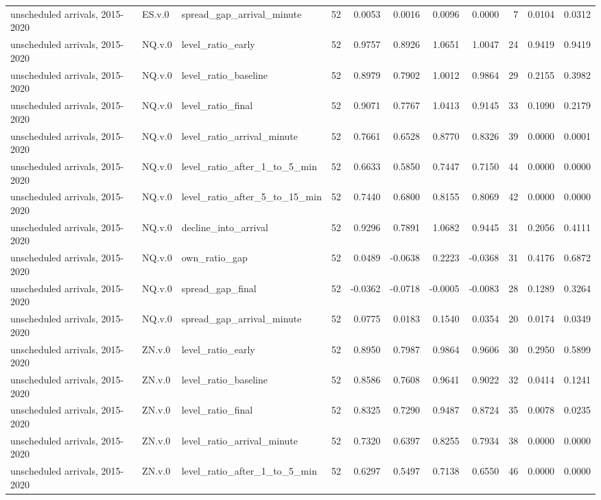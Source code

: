 \begin{tabular}{lllrrrrrrrr}
unscheduled arrivals, 2015-2020 & ES.v.0 & spread_gap_arrival_minute & 52 & 0.0053 & 0.0016 & 0.0096 & 0.0000 & 7 & 0.0104 & 0.0312 \\
unscheduled arrivals, 2015-2020 & NQ.v.0 & level_ratio_early & 52 & 0.9757 & 0.8926 & 1.0651 & 1.0047 & 24 & 0.9419 & 0.9419 \\
unscheduled arrivals, 2015-2020 & NQ.v.0 & level_ratio_baseline & 52 & 0.8979 & 0.7902 & 1.0012 & 0.9864 & 29 & 0.2155 & 0.3982 \\
unscheduled arrivals, 2015-2020 & NQ.v.0 & level_ratio_final & 52 & 0.9071 & 0.7767 & 1.0413 & 0.9145 & 33 & 0.1090 & 0.2179 \\
unscheduled arrivals, 2015-2020 & NQ.v.0 & level_ratio_arrival_minute & 52 & 0.7661 & 0.6528 & 0.8770 & 0.8326 & 39 & 0.0000 & 0.0001 \\
unscheduled arrivals, 2015-2020 & NQ.v.0 & level_ratio_after_1_to_5_min & 52 & 0.6633 & 0.5850 & 0.7447 & 0.7150 & 44 & 0.0000 & 0.0000 \\
unscheduled arrivals, 2015-2020 & NQ.v.0 & level_ratio_after_5_to_15_min & 52 & 0.7440 & 0.6800 & 0.8155 & 0.8069 & 42 & 0.0000 & 0.0000 \\
unscheduled arrivals, 2015-2020 & NQ.v.0 & decline_into_arrival & 52 & 0.9296 & 0.7891 & 1.0682 & 0.9445 & 31 & 0.2056 & 0.4111 \\
unscheduled arrivals, 2015-2020 & NQ.v.0 & own_ratio_gap & 52 & 0.0489 & -0.0638 & 0.2223 & -0.0368 & 31 & 0.4176 & 0.6872 \\
unscheduled arrivals, 2015-2020 & NQ.v.0 & spread_gap_final & 52 & -0.0362 & -0.0718 & -0.0005 & -0.0083 & 28 & 0.1289 & 0.3264 \\
unscheduled arrivals, 2015-2020 & NQ.v.0 & spread_gap_arrival_minute & 52 & 0.0775 & 0.0183 & 0.1540 & 0.0354 & 20 & 0.0174 & 0.0349 \\
unscheduled arrivals, 2015-2020 & ZN.v.0 & level_ratio_early & 52 & 0.8950 & 0.7987 & 0.9864 & 0.9606 & 30 & 0.2950 & 0.5899 \\
unscheduled arrivals, 2015-2020 & ZN.v.0 & level_ratio_baseline & 52 & 0.8586 & 0.7608 & 0.9641 & 0.9022 & 32 & 0.0414 & 0.1241 \\
unscheduled arrivals, 2015-2020 & ZN.v.0 & level_ratio_final & 52 & 0.8325 & 0.7290 & 0.9487 & 0.8724 & 35 & 0.0078 & 0.0235 \\
unscheduled arrivals, 2015-2020 & ZN.v.0 & level_ratio_arrival_minute & 52 & 0.7320 & 0.6397 & 0.8255 & 0.7934 & 38 & 0.0000 & 0.0000 \\
unscheduled arrivals, 2015-2020 & ZN.v.0 & level_ratio_after_1_to_5_min & 52 & 0.6297 & 0.5497 & 0.7138 & 0.6550 & 46 & 0.0000 & 0.0000 \\

\end{tabular}

